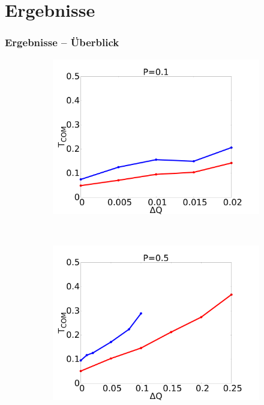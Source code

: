 \documentclass[handout]{beamer}
\begin{document}
\section{Ergebnisse}

\begin{frame}
\frametitle{Ergebnisse -- Überblick}
\begin{figure}[h]
    \begin{center}
        \begin{subfigure}[t]{0.3\textwidth}
            \includegraphics[scale=0.09]{../images/p01_com.pdf}
        \end{subfigure} 
        \
        \begin{subfigure}[t]{0.3\textwidth}
            \includegraphics[scale=0.09]{../images/p05_com.pdf}

\end{subfigure}
\end{center}
\end{figure}
\end{frame}
\end{document}
